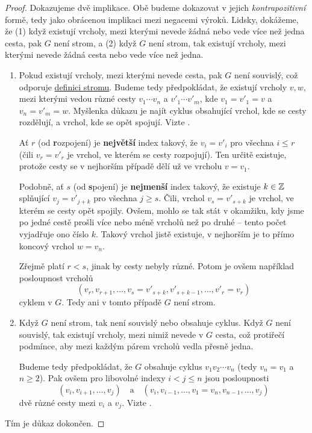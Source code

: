 \begin{proof}
	Dokazujeme dvě implikace. Obě budeme dokazovat v jejich \emph{kontrapozitivní}
	formě, tedy jako obrácenou implikaci mezi negacemi výroků. Lidsky, dokážeme, že
	(1) když existují vrcholy, mezi kterými nevede žádná nebo vede více než jedna
	cesta, pak $G$ není strom, a (2) když $G$ není strom, tak existují vrcholy,
	mezi kterými nevede žádná cesta nebo vede více než jedna.
	\begin{enumerate}
		\item Pokud existují vrcholy, mezi kterými nevede cesta, pak $G$ není
		      souvislý, což odporuje \hyperref[def:strom]{definici stromu}. Budeme tedy
		      předpokládat, že existují vrcholy $v,w$, mezi kterými vedou různé cesty $v_1
			      \cdots v_n$ a $v'_1 \cdots v'_m$, kde $v_1 = v'_1 = v$ a $v_n = v'_m = w$.
		      Myšlenka důkazu je najít cyklus obsahující vrchol, kde se cesty rozdělují, a
		      vrchol, kde se opět spojují. Vizte
		      .

		      Ať $r$ (od \textbf{r}ozpojení) je \textbf{největší} index takový, že $v_i =
			      v'_i$ pro všechna $i \leq r$ (čili $v_r = v'_r$ je vrchol, ve kterém se cesty
		      rozpojují). Ten určitě existuje, protože cesty se v nejhorším případě dělí už
		      ve vrcholu $v = v_1$.

		      Podobně, ať $s$ (od \textbf{s}pojení) je \textbf{nejmenší} index takový, že
		      existuje $k \in \mathbb{Z}$ splňující $v_j = v'_{j+k}$ pro všechna $j \geq s$. Čili,
		      vrchol $v_s = v'_{s+k}$ je vrchol, ve kterém se cesty opět spojily. Ovšem,
		      mohlo se tak stát v okamžiku, kdy jsme po jedné cestě prošli více nebo méně
		      vrcholů než po druhé -- tento počet vyjadřuje ono číslo $k$. Takový vrchol
		      jistě existuje, v nejhorším je to přímo koncový vrchol $w = v_n$.

		      Zřejmě platí $r < s$, jinak by cesty nebyly různé. Potom je ovšem například
		      posloupnost vrcholů
		      \[
			      (v_r,v_{r+1},\ldots,v_s = v'_{s+k},v'_{s+k-1},\ldots,v'_r = v_r)
		      \]
		      cyklem v $G$. Tedy ani v tomto případě $G$ není strom.
		\item Když $G$ není strom, tak není souvislý nebo obsahuje cyklus. Když $G$
		      není souvislý, tak existují vrcholy, mezi nimiž nevede v $G$ cesta, což
		      protiřečí podmínce, aby mezi každým párem vrcholů vedla přesně jedna.

		      Budeme tedy předpokládat, že $G$ obsahuje cyklus $v_1v_2 \cdots v_n$ (tedy
		      $v_n = v_1$ a $n \geq 2$). Pak ovšem pro libovolné indexy $i < j \leq n$ jsou
		      posloupnosti
		      \[
			      (v_i,v_{i+1},\ldots,v_j) \quad \text{a} \quad (v_i,v_{i-1},\ldots,v_1 =
			      v_n,v_{n-1},\ldots,v_j)
		      \]
		      dvě různé cesty mezi $v_i$ a $v_j$. Vizte
		      .
	\end{enumerate}
	Tím je důkaz dokončen.
\end{proof}

